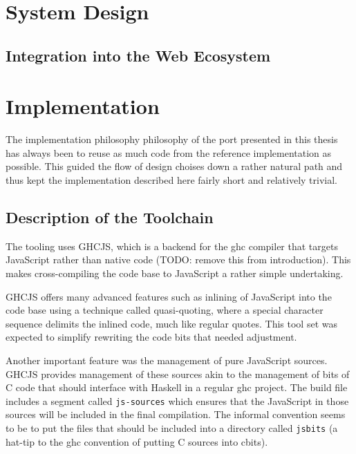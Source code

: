 \documentclass[oneside,11pt,xetex]{scrbook}
\begin{document}
\chapter{System Design}
\label{chap:System Design}

\section{Integration into the Web Ecosystem}


\chapter{Implementation}
\label{chap:Implementation}

The implementation philosophy philosophy of the port presented in this thesis has always been to
reuse as much code from the reference implementation as possible. This guided the flow of design
choises down a rather natural path and thus kept the implementation described here fairly short and
relatively trivial.

\section{Description of the Toolchain}

The tooling uses GHCJS, which is a backend for the \gls{ghc} compiler that targets JavaScript rather
than native code (TODO: remove this from introduction). This makes cross-compiling the code base to
JavaScript a rather simple undertaking.

GHCJS offers many advanced features such as inlining of JavaScript into the code
base using a technique called quasi-quoting, where a special character sequence delimits the
inlined code, much like regular quotes. This tool set was expected to simplify rewriting the code
bits that needed adjustment.

Another important feature was the management of pure JavaScript sources. GHCJS provides management
of these sources akin to the management of bits of C code that should interface with Haskell in a
regular \gls{ghc} project. The build file includes a segment called \texttt{js-sources} which ensures
that the JavaScript in those sources will be included in the final compilation. The informal convention
seems to be to put the files that should be included into a directory called \texttt{jsbits} (a hat-tip
to the \gls{ghc} convention of putting C sources into cbits).
\end{document}
